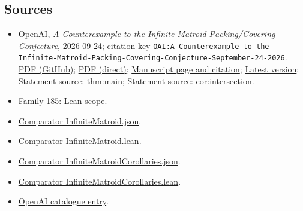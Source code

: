 \documentclass[11pt]{article}
\begin{document}
\subsection{Sources}
\begin{itemize}
\item OpenAI, \emph{A Counterexample to the Infinite Matroid Packing/Covering Conjecture}, 2026-09-24; citation key \texttt{OAI:A-Counterexample-to-the-Infinite-Matroid-Packing-Covering-Conjecture-September-24-2026}. \href{https://github.com/openai/math/blob/adc7f1241b42e322a6451854ab7e4b4c146bf78a/preprints/A-Counterexample-to-the-Infinite-Matroid-Packing-Covering-Conjecture-September-24-2026/paper.pdf}{PDF (GitHub)}; \href{https://github.com/openai/math/raw/adc7f1241b42e322a6451854ab7e4b4c146bf78a/preprints/A-Counterexample-to-the-Infinite-Matroid-Packing-Covering-Conjecture-September-24-2026/paper.pdf}{PDF (direct)}; \href{https://github.com/openai/math/blob/adc7f1241b42e322a6451854ab7e4b4c146bf78a/preprints/A-Counterexample-to-the-Infinite-Matroid-Packing-Covering-Conjecture-September-24-2026/README.md}{Manuscript page and citation}; \href{https://github.com/openai/math/blob/main/preprints/A-Counterexample-to-the-Infinite-Matroid-Packing-Covering-Conjecture-September-24-2026/paper.pdf}{Latest version}; Statement source: \href{https://github.com/openai/math/blob/adc7f1241b42e322a6451854ab7e4b4c146bf78a/preprints/A-Counterexample-to-the-Infinite-Matroid-Packing-Covering-Conjecture-September-24-2026/build/sections/01-introduction.tex\#L32}{thm:main}; Statement source: \href{https://github.com/openai/math/blob/adc7f1241b42e322a6451854ab7e4b4c146bf78a/preprints/A-Counterexample-to-the-Infinite-Matroid-Packing-Covering-Conjecture-September-24-2026/build/sections/01-introduction.tex\#L103}{cor:intersection}.
\item Family 185: \href{https://github.com/openai/math/blob/adc7f1241b42e322a6451854ab7e4b4c146bf78a/lean/docs/185.md}{Lean scope}.
\item \href{https://github.com/openai/math/blob/adc7f1241b42e322a6451854ab7e4b4c146bf78a/lean/ComparatorChallenges/InfiniteMatroid.json}{Comparator InfiniteMatroid.json}.
\item \href{https://github.com/openai/math/blob/adc7f1241b42e322a6451854ab7e4b4c146bf78a/lean/ComparatorChallenges/InfiniteMatroid.lean}{Comparator InfiniteMatroid.lean}.
\item \href{https://github.com/openai/math/blob/adc7f1241b42e322a6451854ab7e4b4c146bf78a/lean/ComparatorChallenges/InfiniteMatroidCorollaries.json}{Comparator InfiniteMatroidCorollaries.json}.
\item \href{https://github.com/openai/math/blob/adc7f1241b42e322a6451854ab7e4b4c146bf78a/lean/ComparatorChallenges/InfiniteMatroidCorollaries.lean}{Comparator InfiniteMatroidCorollaries.lean}.
\item \href{https://github.com/openai/math/blob/adc7f1241b42e322a6451854ab7e4b4c146bf78a/CONTENTS.md}{OpenAI catalogue entry}.
\end{itemize}
\end{document}
